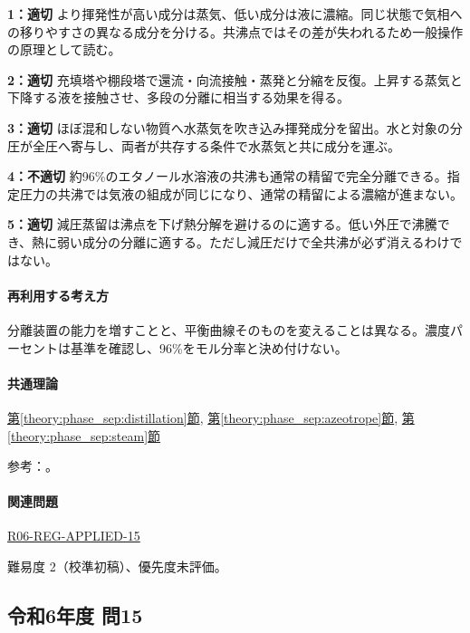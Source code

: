 \noindent\textbf{1：適切} より揮発性が高い成分は蒸気、低い成分は液に濃縮。同じ状態で気相への移りやすさの異なる成分を分ける。共沸点ではその差が失われるため一般操作の原理として読む。\par

\noindent\textbf{2：適切} 充填塔や棚段塔で還流・向流接触・蒸発と分縮を反復。上昇する蒸気と下降する液を接触させ、多段の分離に相当する効果を得る。\par

\noindent\textbf{3：適切} ほぼ混和しない物質へ水蒸気を吹き込み揮発成分を留出。水と対象の分圧が全圧へ寄与し、両者が共存する条件で水蒸気と共に成分を運ぶ。\par

\noindent\textbf{4：不適切} 約96\%のエタノール水溶液の共沸も通常の精留で完全分離できる。指定圧力の共沸では気液の組成が同じになり、通常の精留による濃縮が進まない。\par

\noindent\textbf{5：適切} 減圧蒸留は沸点を下げ熱分解を避けるのに適する。低い外圧で沸騰でき、熱に弱い成分の分離に適する。ただし減圧だけで全共沸が必ず消えるわけではない。\par

\paragraph{再利用する考え方} 分離装置の能力を増すことと、平衡曲線そのものを変えることは異なる。濃度パーセントは基準を確認し、96\%をモル分率と決め付けない。

\paragraph{共通理論} \hyperref[theory:phase_sep:distillation]{第\ref*{theory:phase_sep:distillation}節}, \hyperref[theory:phase_sep:azeotrope]{第\ref*{theory:phase_sep:azeotrope}節}, \hyperref[theory:phase_sep:steam]{第\ref*{theory:phase_sep:steam}節}

\par 参考：\cite{nptel_distillation1,nptel_azeotrope}。

\paragraph{関連問題} \hyperref[q:r06-reg-applied-15]{R06-REG-APPLIED-15}

\par 難易度 2（校準初稿）、優先度未評価。

\subsection{令和6年度 問15}
\label{q:r06-reg-applied-15}

